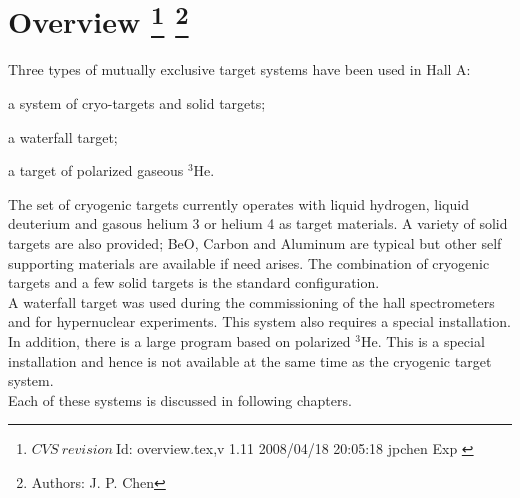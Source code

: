 \chapter[Overview]{ Overview
\label{sec:targets-overv}
\footnote{
  $CVS~revision~ $Id: overview.tex,v 1.11 2008/04/18 20:05:18 jpchen Exp $ $ }
\footnote{Authors: J. P. Chen }
}

Three types of mutually exclusive target systems have been used in Hall A:

\begin{list}{.~}{\setlength{\itemsep}{-0.15cm}}
  \item a system of cryo-targets and solid targets;
  \item a waterfall target;
  \item a target of polarized gaseous $^3$He.
\end{list}

The set of
cryogenic targets currently operates with liquid hydrogen, liquid
deuterium and gasous helium 3 or helium 4
as target materials.
A variety of solid targets are also provided; BeO, Carbon and
Aluminum are typical but other self supporting materials are available if need arises.
The combination of cryogenic targets and a few solid targets is
the standard configuration. \\

A waterfall target was used during the commissioning of
the hall spectrometers and for hypernuclear experiments. This system also 
requires a special installation. \\

In addition,
there is a large program based on polarized $^3$He. This
is a special installation and hence is not available at the same
time as the cryogenic target system.\\

Each of these systems is discussed in following chapters.

